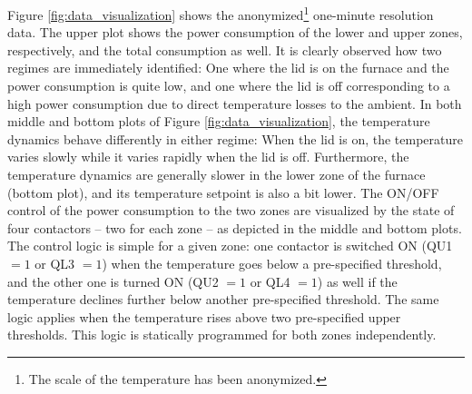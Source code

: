 \documentclass[sigconf]{acmart}
\begin{document}
Figure \ref{fig:data_visualization} shows the anonymized\footnote{The scale of the temperature has been anonymized.} one-minute resolution data. The upper plot shows the power consumption of the lower and upper zones, respectively, and the total consumption as well. It is clearly observed how two regimes are immediately identified: One where the lid is on the furnace and the power consumption is quite low, and one where the lid is off corresponding to a high power consumption due to direct temperature losses to the ambient. In both middle and bottom plots of Figure \ref{fig:data_visualization}, the temperature dynamics behave differently in either regime: When the lid is on, the temperature varies slowly while it varies rapidly when the lid is off. Furthermore, the temperature dynamics are generally slower in the lower zone of the furnace (bottom plot), and its temperature setpoint is also a bit lower. The ON/OFF control of the power consumption to the two zones are visualized by the state of four contactors -- two for each zone -- as depicted in the middle and bottom plots. The control logic is simple for a given zone: one contactor is switched ON (QU1 $=1$ or QL3 $=1$) when the temperature goes below a pre-specified threshold, and the other one is turned ON (QU2 $=1$ or QL4 $=1$) as well if the temperature declines further below another pre-specified threshold. The same logic applies when the temperature rises above two pre-specified upper thresholds. This logic is statically programmed for both zones independently.
\end{document}
